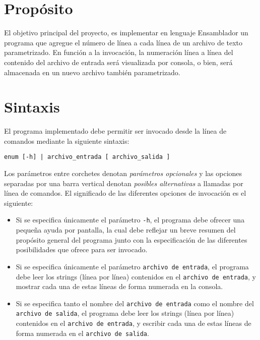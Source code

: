 \documentclass[12pt,a4paper]{article}
\begin{document}

\section*{Propósito}
El objetivo principal del proyecto, es implementar en lenguaje Ensamblador un programa que agregue el número de línea a cada línea de un archivo de texto parametrizado. En función a la invocación, la numeración línea a línea del contenido del archivo de entrada será visualizada por consola, o bien, será almacenada en un nuevo archivo también parametrizado.

\section*{Sintaxis}
El programa implementado debe permitir ser invocado desde la línea de comandos mediante la siguiente sintaxis:
\begin{center}
	\texttt{enum [-h] | archivo\_entrada [ archivo\_salida ]}
\end{center}

Los parámetros entre corchetes denotan \textit{parámetros opcionales} y las opciones separadas por una barra vertical denotan \textit{posibles alternativas} a llamadas por línea de comandos. El significado de las diferentes opciones de invocación es el siguiente:
\begin{itemize}
	\item Si se especifica únicamente el parámetro \texttt{-h}, el programa debe ofrecer una pequeña ayuda por pantalla, la cual debe reflejar un breve resumen del propósito general del programa junto con la especificación de las diferentes posibilidades que ofrece para ser invocado.
	\item Si se especifica únicamente el parámetro \texttt{archivo de entrada}, el programa debe leer los strings (línea por línea) contenidos en el \texttt{archivo de entrada}, y mostrar cada una de estas líneas de forma numerada en la consola. 
	\item Si se especifica tanto el nombre del \texttt{archivo de entrada} como el nombre del \texttt{archivo de salida}, el programa debe leer los strings (línea por línea) contenidos en el \texttt{archivo de entrada}, y escribir cada una de estas líneas de forma numerada en el \texttt{archivo de salida}.
\end{itemize}
	
\end{document}
